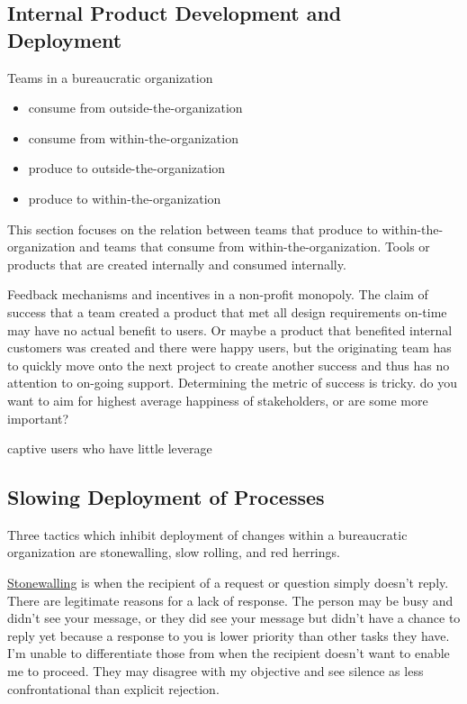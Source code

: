 \subsection*{Internal Product Development and Deployment\label{sec:internal_product}}

Teams in a bureaucratic organization 
\begin{itemize}
    \item consume from outside-the-organization
    \item consume from within-the-organization
    \item produce to outside-the-organization
    \item produce to within-the-organization
\end{itemize}

This section focuses on the relation between teams that produce to within-the-organization and teams that consume from within-the-organization. Tools or products that are created internally and consumed internally.

Feedback mechanisms and incentives in a non-profit monopoly. The claim of success that a team created a product that met all design requirements on-time may have no actual benefit to users. Or maybe a product that benefited internal customers was created and there were happy users, but the originating team has to quickly move onto the next project to create another success and thus has no attention to on-going support. Determining the metric of success is tricky. do you want to aim for highest average happiness of stakeholders, or are some more important?

captive users who have little leverage 


\subsection*{Slowing Deployment of Processes\label{sec:slow_deployment}}

Three tactics which inhibit deployment of changes within a bureaucratic organization are stonewalling, slow rolling, and red herrings. 

\underline{Stonewalling} is when the recipient of a request or question simply doesn't reply. There are legitimate reasons for a lack of response. The person may be busy and didn't see your message, or they did see your message but didn't have a chance to reply yet because a response to you is lower priority than other tasks they have. I'm unable to differentiate those from when the recipient doesn't want to enable me to proceed. They may disagree with my objective and see silence as less confrontational than explicit rejection. 

